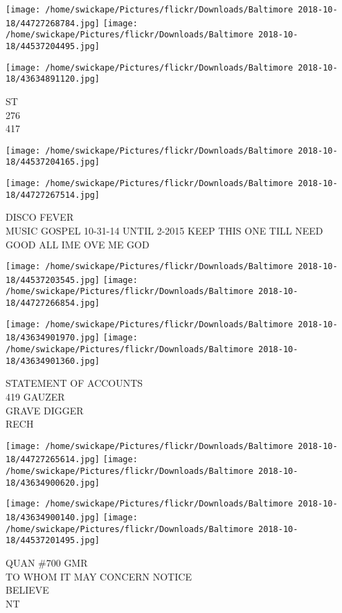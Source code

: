 \documentclass[10pt,letterpaper]{article}
\begin{document}
\texttt{[image: /home/swickape/Pictures/flickr/Downloads/Baltimore 2018-10-18/44727268784.jpg]}
\texttt{[image: /home/swickape/Pictures/flickr/Downloads/Baltimore 2018-10-18/44537204495.jpg]}

\vspace{0.25in}
\texttt{[image: /home/swickape/Pictures/flickr/Downloads/Baltimore 2018-10-18/43634891120.jpg]}

ST\\
276\\
417\\
\pagebreak

\texttt{[image: /home/swickape/Pictures/flickr/Downloads/Baltimore 2018-10-18/44537204165.jpg]}

\vspace{0.25in}
\texttt{[image: /home/swickape/Pictures/flickr/Downloads/Baltimore 2018-10-18/44727267514.jpg]}

DISCO FEVER\\
MUSIC GOSPEL 10{-}31{-}14 UNTIL 2{-}2015 KEEP THIS ONE TILL NEED GOOD ALL IME OVE ME GOD\\
\pagebreak

\texttt{[image: /home/swickape/Pictures/flickr/Downloads/Baltimore 2018-10-18/44537203545.jpg]}
\texttt{[image: /home/swickape/Pictures/flickr/Downloads/Baltimore 2018-10-18/44727266854.jpg]}

\texttt{[image: /home/swickape/Pictures/flickr/Downloads/Baltimore 2018-10-18/43634901970.jpg]}
\texttt{[image: /home/swickape/Pictures/flickr/Downloads/Baltimore 2018-10-18/43634901360.jpg]}

STATEMENT OF ACCOUNTS\\
419 GAUZER\\
GRAVE DIGGER\\
RECH\\
\pagebreak

\texttt{[image: /home/swickape/Pictures/flickr/Downloads/Baltimore 2018-10-18/44727265614.jpg]}
\texttt{[image: /home/swickape/Pictures/flickr/Downloads/Baltimore 2018-10-18/43634900620.jpg]}

\texttt{[image: /home/swickape/Pictures/flickr/Downloads/Baltimore 2018-10-18/43634900140.jpg]}
\texttt{[image: /home/swickape/Pictures/flickr/Downloads/Baltimore 2018-10-18/44537201495.jpg]}

QUAN \#700 GMR\\
TO WHOM IT MAY CONCERN NOTICE\\
BELIEVE\\
NT\\
\pagebreak
\end{document}
